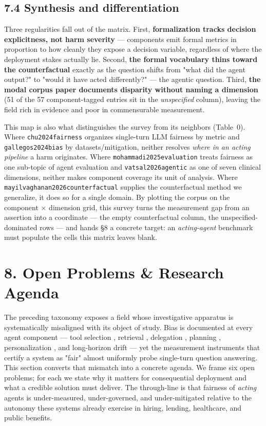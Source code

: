 \documentclass[sigconf,nonacm]{acmart}
\begin{document}
\subsection{7.4 Synthesis and differentiation}

Three regularities fall out of the matrix. First, \textbf{formalization tracks decision explicitness, not harm severity} — components emit formal metrics in proportion to how cleanly they expose a decision variable, regardless of where the deployment stakes actually lie. Second, \textbf{the formal vocabulary thins toward the counterfactual} exactly as the question shifts from "what did the agent output?" to "would it have acted differently?" — the agentic question. Third, \textbf{the modal corpus paper documents disparity without naming a dimension} (51 of the 57 component-tagged entries sit in the \emph{unspecified} column), leaving the field rich in evidence and poor in commensurable measurement.

This map is also what distinguishes the survey from its neighbors (Table~0). Where \texttt{chu2024fairness} organizes single-turn LLM fairness by metric and \texttt{gallegos2024bias} by datasets/mitigation, neither resolves \emph{where in an acting pipeline} a harm originates. Where \texttt{mohammadi2025evaluation} treats fairness as one sub-topic of agent evaluation and \texttt{vatsal2026agentic} as one of seven clinical dimensions, neither makes component coverage its unit of analysis. Where \texttt{mayilvaghanan2026counterfactual} supplies the counterfactual method we generalize, it does so for a single domain. By plotting the corpus on the component × dimension grid, this survey turns the measurement gap from an assertion into a coordinate — the empty counterfactual column, the unspecified-dominated rows — and hands §8 a concrete target: an \emph{acting-agent} benchmark must populate the cells this matrix leaves blank.



\section{8. Open Problems & Research Agenda}

The preceding taxonomy exposes a field whose investigative apparatus is systematically misaligned with its object of study. Bias is documented at every agent component — tool selection \cite{blankenstein2025biasbusters}, retrieval \cite{wu2024rag}, delegation \cite{nguyen2025social}, planning \cite{li2025actions}, personalization \cite{kantharuban2024stereotype}, and long-horizon drift \cite{ma2026implicit} — yet the measurement instruments that certify a system as "fair" almost uniformly probe single-turn question answering. This section converts that mismatch into a concrete agenda. We frame six open problems; for each we state why it matters for consequential deployment and what a credible solution must deliver. The through-line is that fairness of \emph{acting} agents is under-measured, under-governed, and under-mitigated relative to the autonomy these systems already exercise in hiring, lending, healthcare, and public benefits.
\end{document}
